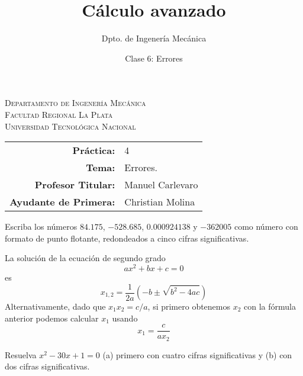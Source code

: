 \documentclass[11pt]{article}
\title{Cálculo avanzado}
\author{Dpto. de Ingenería Mecánica}
\date{Clase 6: Errores}
\begin{document}

\begin{center}
\end{center}

\begin{center}
	\vspace{\baselineskip}
	\Large{\textsc{Departamento de Ingenería Mecánica}} \\
	\textsc{Facultad Regional La Plata} \\
	\textsc{Universidad Tecnológica Nacional}
\end{center}


\begin{center}
	\begin{tabular}{r l}
		\textbf{Práctica:}            & 4                \\
		\textbf{Tema:}                & Errores.         \\
		\textbf{Profesor Titular:}    & Manuel Carlevaro \\
		\textbf{Ayudante de Primera:} & Christian Molina
	\end{tabular}\end{center}

\vspace{1em}

\begin{question} %
	Escriba los números $84.175$, $-528.685$, $0.000924138$ y $-362005$ como número con formato de punto flotante, redondeados a cinco cifras significativas.
\end{question}

\begin{question}  %
	La solución de la ecuación de segundo grado
	\[ a x^2 + b x + c = 0 \]
	es
	\[ x_{1,2} = \frac{1}{2a} \left( -b \pm \sqrt{b^2 - 4 a c} \right) \]
	Alternativamente, dado que $x_1 x_2 = c/a$, si primero obtenemos $x_2$ con la fórmula anterior podemos calcular $x_1$ usando
	\[ x_1 = \frac{c}{a x_2} \]

	Resuelva $x^2 - 30 x + 1 = 0$ (a) primero con cuatro cifras significativas y (b) con dos cifras significativas.
\end{question}
\end{document}
